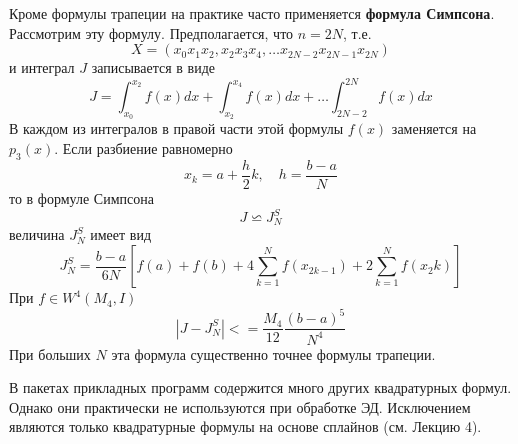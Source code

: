 Кроме формулы трапеции на практике часто применяется \textbf{формула Симпсона}. Рассмотрим эту формулу. Предполагается, что $n=2N$, т.е.
\begin{equation}
	X = (x_0 x_1 x_2, x_2 x_3 x_4, \dots x_{2N-2}x_{2N-1}x_{2N})
\end{equation}
и интеграл $J$ записывается в виде
\begin{equation}
	J=\int_{x_0}^{x_2}f(x)dx + \int_{x_2}^{x_4}f(x)dx + \dots \int_{2N-2}^{2N}f(x)dx
\end{equation}
В каждом из интегралов в правой части этой формулы $f(x)$ заменяется на $p_3(x)$. Если разбиение равномерно
\begin{equation}
	x_k = a + \frac{h}{2}k, \quad h=\frac{b-a}{N}
\end{equation}
то в формуле Симпсона
\begin{equation}
	J \backsimeq J_N^S
\end{equation}
величина $J_N^S$ имеет вид
\begin{equation}
	J_N^S = \frac{b-a}{6N}[f(a) + f(b) + 4\sum_{k=1}^{N}f(x_{2k-1}) + 2\sum_{k=1}^{N}f(x_2k)]
\end{equation}
При $f \in W^4(M_4,I)$
\begin{equation}
	|J-J^S_N| <= \frac{M_4}{12}\frac{(b-a)^5}{N^4}
\end{equation}
При больших $N$ эта формула существенно точнее формулы трапеции.

В пакетах прикладных программ содержится много других квадратурных формул. Однако они практически не используются при обработке ЭД. Исключением являются только квадратурные формулы на основе сплайнов (см. Лекцию 4).